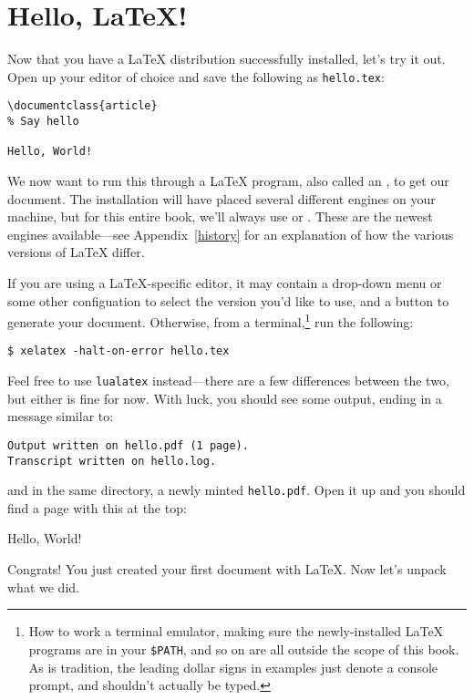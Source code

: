 \chapter{Hello, \texorpdfstring{\LaTeX}{LaTeX}!}

Now that you have a \LaTeX{} distribution successfully installed,
let's try it out.
Open up your editor of choice and save the following as \texttt{hello.tex}:
\begin{leftfigure}
\begin{lstlisting}
\documentclass{article}
% Say hello

Hello, World!

\end{lstlisting}
\end{leftfigure}
We now want to run this through a \LaTeX{} program,
also called an , to get our document.
The installation will have placed several different engines on your
machine, but for this entire book, we'll always use \LuaLaTeX or \XeLaTeX.
These are the newest engines available---see Appendix~\ref{history} for an
explanation of how the various versions of \LaTeX{} differ.

If you are using a \LaTeX{}-specific editor, it may contain a drop-down menu
or some other configuation to select the version you'd like to use,
and a button to generate your document.
Otherwise, from a terminal,\punckern\footnote{How to work a terminal emulator,
making sure the newly-installed \LaTeX{} programs are in your \texttt{\$PATH},
and so on are all outside the scope of this book.
As is tradition, the leading dollar signs in examples just denote a console
prompt, and shouldn't actually be typed.}
run the following:
\begin{leftfigure}
\begin{lstlisting}
$ xelatex -halt-on-error hello.tex
\end{lstlisting}
\end{leftfigure}
Feel free to use \texttt{lualatex} instead---there are a few differences
between the two, but either is fine for now.
With luck, you should see some output, ending in a message similar to:
\begin{leftfigure}
\begin{lstlisting}
Output written on hello.pdf (1 page).
Transcript written on hello.log.
\end{lstlisting}
\end{leftfigure}
and in the same directory, a newly minted \texttt{hello.pdf}.
Open it up and you should find a page with this at the top:
\begin{leftfigure}
\lm Hello, World!
\end{leftfigure}
Congrats!
You just created your first document with \LaTeX.
Now let's unpack what we did.

